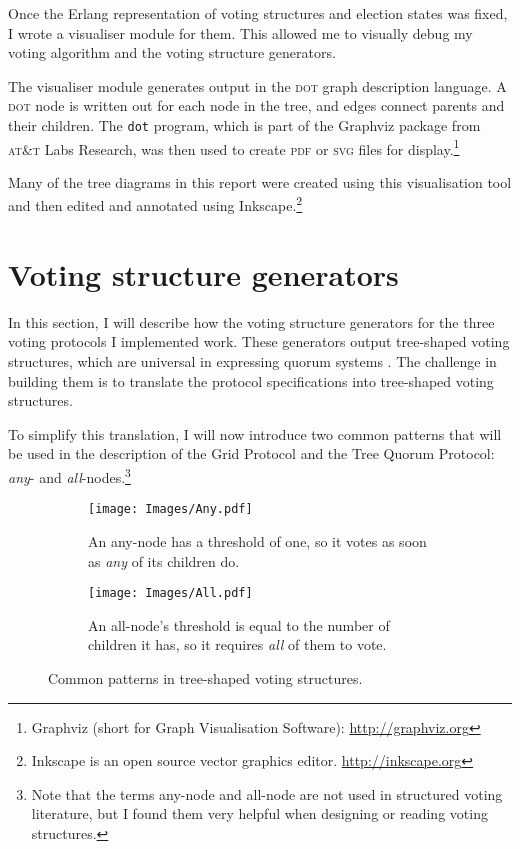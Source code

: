 \documentclass[11pt,chapterprefix=true,toc=bibliography,numbers=noendperiod,
               footnotes=multiple,twoside]{scrreprt}
\begin{document}
Once the Erlang representation of voting structures and election states was fixed, I wrote a visualiser module for them. This allowed me to visually debug my voting algorithm and the voting structure generators.

The visualiser module generates output in the \textsc{dot} graph description language. A \textsc{dot} node is written out for each node in the tree, and edges connect parents and their children. The \texttt{dot} program, which is part of the Graphviz package from \textsc{at\&t} Labs Research, was then used to create \textsc{pdf} or \textsc{svg} files for display.\footnote{Graphviz (short for Graph Visualisation Software): \url{http://graphviz.org}}

Many of the tree diagrams in this report were created using this visualisation tool and then edited and annotated using Inkscape.\footnote{Inkscape is an open source vector graphics editor. \url{http://inkscape.org}}

\section{Voting structure generators\label{sc:voting}}

In this section, I will describe how the voting structure generators for the three voting protocols I implemented work. These generators output tree-shaped voting structures, which are universal in expressing quorum systems \autocite{structures}. The challenge in building them is to translate the protocol specifications into tree-shaped voting structures.

To simplify this translation, I will now introduce two common patterns that will be used in the description of the Grid Protocol and the Tree Quorum Protocol: \emph{any}- and \emph{all}-nodes.\footnote{Note that the terms any-node and all-node are not used in structured voting literature, but I found them very helpful when designing or reading voting structures.}

\begin{figure}[h]
    \centering
    \begin{subfigure}[t]{0.4\textwidth}
        \texttt{[image: Images/Any.pdf]}
        \caption{An any-node has a threshold of one, so it votes as soon as \emph{any} of its children do.}
        \label{fig:any}
    \end{subfigure}
    \quad
    \begin{subfigure}[t]{0.4\textwidth}
        \texttt{[image: Images/All.pdf]}
        \caption{An all-node's threshold is equal to the number of children it has, so it requires \emph{all} of them to vote.}
        \label{fig:all}
    \end{subfigure}
    \caption{Common patterns in tree-shaped voting structures.}
    \label{fig:tsvs-patterns}
\end{figure}
\end{document}
